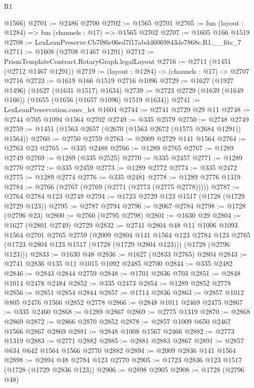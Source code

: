 \begin{lexlean}{R1}
\begin{coremodule}
      @1566)
@2701 := @2486 @2700
@2702 := @1565 @2701
@2705 := fun (layout : @1284) => fun (channels : @17) => @1565 @2702
@2707 := @1605 @166 @1519
@2708 := LexLeanPreserve.Cb7f86c06ed7f17abdd6069843de7868e.R1.__fits_7
@2711 := @1608 (@2708 @1467 @1291)
@2712 := PrismTemplateContract.RotaryGraph.legalLayout
@2716 := @2711 (@1451 (@2712 @1467 @1291))
@2719 := (layout : @1284) -> (channels : @17) -> @2707 @2716
@2723 := @1619 @166 @1519 @2716 @1096
@2729 := @1627 (@1927 @1496) (@1627 (@1631 @1517) @1634)
@2739 := @2723 @2729 (@1639 (@1649 @166)) (@1655 (@1656 (@1657 @1096) @1519 @1634))
@2741 := LexLeanPreservation.conv_let @1604
@2744 := @2741 @2729 @29 @11
@2748 := @2744 @705 @1094 @1564 @2702
@2749 := @335 @2579
@2750 := @2748 @2749
@2759 := @1451 (@1563 @2657 (@2670 (@1563 @2672 (@1575 @2684 @1291)) @1564))
@2760 := @2750 @2759
@2763 := @2009 @2729 @141 @1564
@2764 := @2763 @23
@2765 := @335 @2488
@2766 := @1289 @2765
@2767 := @1289 @2749
@2769 := @1289 (@335 @2525)
@2770 := @335 @2457
@2771 := @1289 @2770
@2772 := @335 @2459
@2773 := @1289 @2772
@2774 := @335 @2472
@2775 := @1289 @2774
@2776 := @335 @2481
@2778 := @1289 @2776 @1319
@2784 := @2766 (@2767 (@2769 (@2771 (@2773 (@2775 @2778)))))
@2787 := @2764 @2784 @123 @2749
@2794 := @1723 @2729 @123 @1517 (@1728 (@1729 @2729 @123))
@2795 := @2787 @2794
@2796 := @2067 @2784
@2798 := @1728 (@2796 @23)
@2800 := @2760 (@2795 @2798)
@2801 := @1630 @29
@2804 := @1627 (@2801 @2749) @2729
@2832 := @2741
    @2804
    @48
    @11
    @1006
    @1093
    @1564
    @2701
    @2765
    @2759
    (@2009
      @2804
      @141
      @1564
      @123
      @2784
      @123
      @2765
      (@1723 @2804 @123 @1517 (@1728 (@1729 @2804 @123)))
      (@1728 (@2796 @123)))
@2833 := @1630 @48
@2836 := @1627 (@2833 @2765) @2804
@2843 := @2741 @2836 @135 @11 @1015 @1092 @2485 @2700
@2844 := @335 @2482
@2846 := @2843 @2844 @2759
@2848 := @1701 @2836 @703
@2851 := @2848 @1014 @2478 @2484
@2852 := @335 @2473
@2854 := @1289 @2852 @2778
@2856 := @2851 @2854 @2844
@2857 := @1714 @2836
@2863 := @2857 @1012 @805 @2476 @1566 @2852 @2778
@2866 := @2848 @1011 @2469 @2475
@2867 := @335 @2460
@2868 := @1289 @2867
@2869 := @2775 @1319
@2870 := @2868 @2869
@2872 := @2866 @2870 @2852
@2878 := @2857 @1009 @650 @2467 @1566 @2867 @2869
@2881 := @2848 @1008 @1567 @2466
@2882 := @2773 @1319
@2883 := @2771 @2882
@2885 := @2881 @2883 @2867
@2891 := @2857 @634 @642 @1564 @1566 @2770 @2882
@2894 := @2009 @2836 @141 @1564
@2898 := @2894 @48 @2784 @123 @2770
@2905 := @1723 @2836 @123 @1517 (@1728 (@1729 @2836 @123))
@2906 := @2898 @2905
@2908 := @1728 (@2796 @48)

\end{coremodule}
\end{lexlean}
